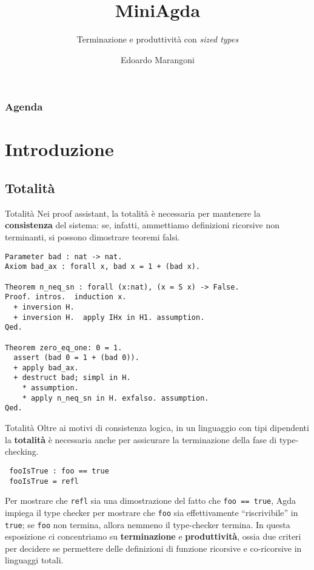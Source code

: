 \documentclass[t,aspectratio=169,10pt]{beamer}
\title{MiniAgda}
\subtitle{Terminazione e produttività con \textit{sized types}}
\date{}
\author{Edoardo Marangoni}
\begin{document}
\frame[plain]{\titlepage}

\begin{frame}[t,plain]
	\frametitle{Agenda}
	\tableofcontents
\end{frame}


\section[intro]{Introduzione}
\subsection[totalità]{Totalità}
\begin{frame}[fragile]{Totalità}
	Nei proof assistant, la totalità è necessaria per mantenere la
	\textbf{consistenza} del sistema: se, infatti, ammettiamo definizioni ricorsive
	non terminanti, si possono dimostrare teoremi falsi.
	\vfill
	\begin{verbatim}
Parameter bad : nat -> nat.
Axiom bad_ax : forall x, bad x = 1 + (bad x).

Theorem n_neq_sn : forall (x:nat), (x = S x) -> False.
Proof. intros.  induction x.
  + inversion H.
  + inversion H.  apply IHx in H1. assumption.
Qed.

Theorem zero_eq_one: 0 = 1.
  assert (bad 0 = 1 + (bad 0)).
  + apply bad_ax.
  + destruct bad; simpl in H.
    * assumption.
    * apply n_neq_sn in H. exfalso. assumption.
Qed.
\end{verbatim}
\end{frame}

\begin{frame}[fragile]{Totalità}
	Oltre ai motivi di consistenza logica, in un linguaggio con tipi dipendenti la
		{\bf totalità} è necessaria anche per assicurare la terminazione della fase di
	type-checking.

	\begin{verbatim}
 fooIsTrue : foo == true
 fooIsTrue = refl
\end{verbatim}

	Per mostrare che \texttt{refl} sia una dimostrazione del fatto che \texttt{foo
		== true}, Agda impiega il type checker per mostrare che \texttt{foo} sia
	effettivamente ``riscrivibile'' in \texttt{true}; se \texttt{foo} non termina,
	allora nemmeno il type-checker termina. In questa esposizione ci concentriamo su
		{\bf terminazione} e {\bf produttività}, ossia due criteri per decidere se
	permettere delle definizioni di funzione ricorsive e co-ricorsive in linguaggi
	totali.
\end{frame}
\end{document}

